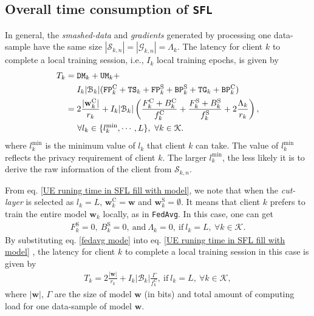 \documentclass[10pt,journal,transmag]{IEEEtran}
\begin{document}
\subsection{Overall time consumption of \texttt{SFL}}
In general, the \textit{smashed-data} and \textit{gradients} generated by processing one data-sample have the same size $|\mathcal{S}_{k,n}|=|\mathcal{G}_{k,n}|=\Lambda_k$. The latency for client $k$ to complete a local training session, i.e., $I_k$ local training epochs, is given by
\begin{align}
    T_k & = \texttt{DM}_k + \texttt{UM}_k + \notag \\
    &\ \ \ \ I_k |\mathcal{B}_k| (\texttt{FP}_k^\text{C} + \texttt{TS}_k + \texttt{FP}_k^\text{S} + \texttt{BP}_k^\text{S} + \texttt{TG}_k + \texttt{BP}_k^\text{C}) \notag \\
    & = 2\frac{|\textbf{w}^\text{C}_k|}{r_k} + I_k |\mathcal{B}_k| \left( \frac{ F^\text{C}_k+B^\text{C}_k}{f_k^\text{C}} + \frac{ F^\text{S}_k+B^\text{S}_k}{f_k^\text{S}} + 2\frac{\Lambda_k}{r_k} \right), \notag \\
    & \;\;\;\;\; \forall l_k \in \{l_k^\text{min}, \cdots, L\}, \ \forall k \in \mathcal{K}. \label{UE runing time in SFL fill with model} 
\end{align}
where $l_k^\text{min}$ is the minimum value of $l_k$ that client $k$ can take. The value of $l_k^\text{min}$ reflects the privacy requirement of client $k$. The larger $l_k^\text{min}$, the less likely it is to derive the raw information of the client from $\mathcal{S}_{k,n}$.

From eq. \eqref{UE runing time in SFL fill with model}, we note that when the \textit{cut-layer} is selected as $l_k=L$, $\textbf{w}^\text{C}_k=\textbf{w}$ and $\textbf{w}^\text{S}_k = \emptyset$. It means that client $k$ prefers to train the entire model $\textbf{w}_k$ locally, as in \texttt{FedAvg}. In this case, one can get
\begin{align}
    F^\text{S}_k=0,\ B^\text{S}_k=0, \ \text{and}\ \Lambda_k=0,\ \text{if}\ l_k=L,\ \forall k \in \mathcal{K}.
    \label{fedavg mode}
\end{align}
By substituting eq. \eqref{fedavg mode} into eq. \eqref{UE runing time in SFL fill with model} , the latency for client $k$ to complete a local training session in this case is given by 
\begin{align}
    T_k = 2\frac{|\textbf{w}|}{r_k}+ I_k |\mathcal{B}_k| \frac{\Gamma}{f^\text{C}_k},\ \text{if}\ l_k=L,\ \forall k \in \mathcal{K}, \label{Time consumption T_k at layer L}
\end{align}
where $|\textbf{w}|$, $\Gamma$ are the size of model $\textbf{w}$ (in bits) and total amount of computing load for one data-sample of model $\textbf{w}$.
\end{document}
